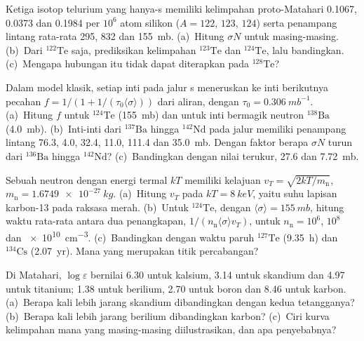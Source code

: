 \begin{exercise}[$\star\star$]\label{exo:b3:origin-of-elements:5}
Ketiga isotop telurium yang hanya-s memiliki kelimpahan proto-Matahari
\num{0.1067}, \num{0.0373} dan \num{0.1984} per $10^6$ atom silikon
($A = 122$, $123$, $124$) serta penampang lintang rata-rata \num{295},
\num{832} dan \qty{155}{mb}. (a)~Hitung $\sigma N$ untuk masing-masing. (b)~Dari
$^{122}\mathrm{Te}$ saja, prediksikan kelimpahan $^{123}\mathrm{Te}$
dan $^{124}\mathrm{Te}$, lalu bandingkan. (c)~Mengapa hubungan itu tidak dapat
diterapkan pada $^{128}\mathrm{Te}$?
\end{exercise}

\begin{exercise}[$\star\star$]\label{exo:b3:origin-of-elements:6}
Dalam model klasik, setiap inti pada jalur s meneruskan ke inti berikutnya
pecahan $f = 1/(1 + 1/(\tau_0\langle\sigma\rangle))$ dari
aliran, dengan $\tau_0 = \qty{0.306}{mb^{-1}}$. (a)~Hitung $f$ untuk
$^{124}\mathrm{Te}$ (\qty{155}{mb}) dan untuk inti bermagik neutron
$^{138}\mathrm{Ba}$ (\qty{4.0}{mb}). (b)~Inti-inti dari
$^{137}\mathrm{Ba}$ hingga $^{142}\mathrm{Nd}$ pada jalur memiliki
penampang lintang \num{76.3}, \num{4.0}, \num{32.4}, \num{11.0},
\num{111.4} dan \qty{35.0}{mb}. Dengan faktor berapa $\sigma N$ turun dari
$^{136}\mathrm{Ba}$ hingga $^{142}\mathrm{Nd}$? (c)~Bandingkan dengan
nilai terukur, \num{27.6} dan \qty{7.72}{mb}.
\end{exercise}

\begin{exercise}[$\star\star$]\label{exo:b3:origin-of-elements:7}
Sebuah neutron dengan energi termal $kT$ memiliki kelajuan
$v_T = \sqrt{2kT/m_\mathrm{n}}$, $m_\mathrm{n} = \qty{1.6749e-27}{kg}$.
(a)~Hitung $v_T$ pada $kT = \qty{8}{keV}$, yaitu suhu lapisan
karbon-13 pada raksasa merah. (b)~Untuk $^{124}\mathrm{Te}$, dengan
$\langle\sigma\rangle = \qty{155}{mb}$, hitung waktu rata-rata antara
dua penangkapan, $1/(n_\mathrm{n}\langle\sigma\rangle v_T)$, untuk
$n_\mathrm{n} = 10^6$, $10^8$ dan \qty{e10}{cm^{-3}}. (c)~Bandingkan dengan
waktu paruh $^{127}\mathrm{Te}$ (\qty{9.35}{h}) dan
$^{134}\mathrm{Cs}$ (\qty{2.07}{yr}). Mana yang merupakan titik percabangan?
\end{exercise}

\begin{exercise}[$\star\star$]\label{exo:b3:origin-of-elements:8}
Di Matahari, $\log\varepsilon$ bernilai \num{6.30} untuk kalsium, \num{3.14} untuk
skandium dan \num{4.97} untuk titanium; \num{1.38} untuk berilium,
\num{2.70} untuk boron dan \num{8.46} untuk karbon. (a)~Berapa kali lebih jarang
skandium dibandingkan dengan kedua tetangganya? (b)~Berapa kali lebih jarang
berilium dibandingkan karbon? (c)~Ciri kurva kelimpahan mana yang
masing-masing diilustrasikan, dan apa penyebabnya?
\end{exercise}


